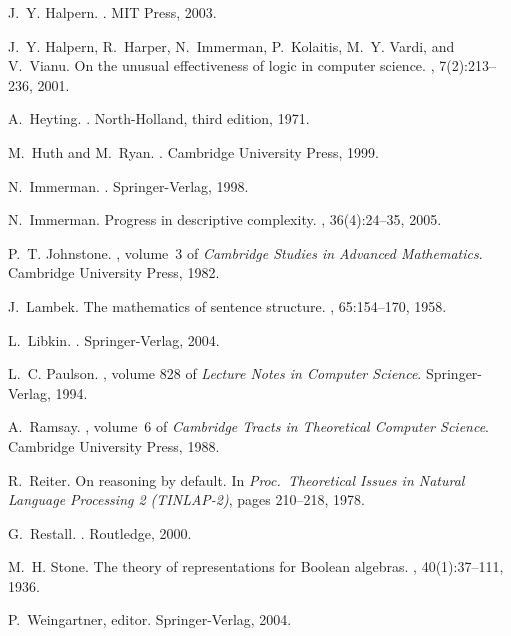 \documentclass[11pt]{article}
\newcommand{\<}{\langle}
\renewcommand{\>}{\rangle}
\begin{document}
\begin{thebibliography}{10}
J.~Y. Halpern.
.
\newblock MIT Press, 2003.

J.~Y. Halpern, R.~Harper, N.~Immerman, P.~Kolaitis, M.~Y. Vardi, and V.~Vianu.
\newblock On the unusual effectiveness of logic in computer science.
, 7(2):213--236, 2001.

A.~Heyting.
.
\newblock North-Holland, third edition, 1971.

M.~Huth and M.~Ryan.
.
\newblock Cambridge University Press, 1999.

N.~Immerman.
.
\newblock Springer-Verlag, 1998.

N.~Immerman.
\newblock Progress in descriptive complexity.
, 36(4):24--35, 2005.

P.~T. Johnstone.
, volume~3 of {\em Cambridge Studies in Advanced
  Mathematics}.
\newblock Cambridge University Press, 1982.

J.~Lambek.
\newblock The mathematics of sentence structure.
, 65:154--170, 1958.

L.~Libkin.
.
\newblock Springer-Verlag, 2004.

L.~C. Paulson.
, volume 828 of {\em Lecture
  Notes in Computer Science}.
\newblock Springer-Verlag, 1994.

A.~Ramsay.
, volume~6 of {\em
  Cambridge Tracts in Theoretical Computer Science}.
\newblock Cambridge University Press, 1988.

R.~Reiter.
\newblock On reasoning by default.
\newblock In {\em Proc.~Theoretical Issues in Natural Language Processing 2
  (TINLAP-2)}, pages 210--218, 1978.

G.~Restall.
.
\newblock Routledge, 2000.

M.~H. Stone.
\newblock The theory of representations for {Boolean} algebras.
,
  40(1):37--111, 1936.

P.~Weingartner, editor.
\newblock Springer-Verlag, 2004.

\end{thebibliography}
\end{document}
